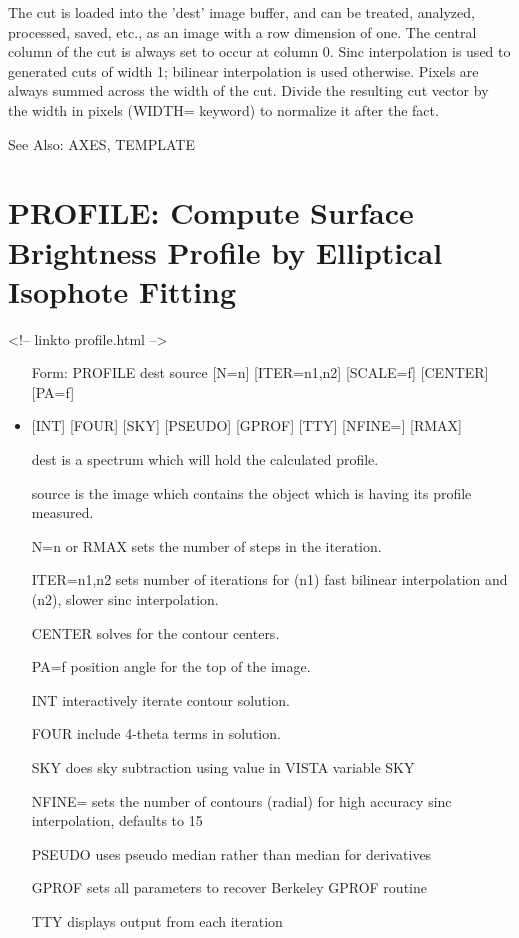 The cut is loaded into the 'dest' image buffer, and can be treated,
analyzed, processed, saved, etc., as an image with a row dimension of one.
The central column of the cut is always set to occur at column 0.  Sinc
interpolation is used to generated cuts of width 1; bilinear interpolation
is used otherwise.  Pixels are always summed across the width of the cut.
Divide the resulting cut vector by the width in pixels (WIDTH= keyword) to
normalize it after the fact.

See Also: AXES, TEMPLATE


\section{PROFILE: Compute Surface Brightness Profile by Elliptical
         Isophote Fitting}
\begin{rawhtml}
<!-- linkto profile.html -->
\end{rawhtml}
\begin{itemize}
  \item[Form: PROFILE dest source {[N=n]} {[ITER=n1,n2]} {[SCALE=f]} 
       {[CENTER]} {[PA=f]} \hfill]{}
  \item{{[INT]} {[FOUR]} {[SKY]} {[PSEUDO]} {[GPROF]} {[TTY]} {[NFINE=]} 
       {[RMAX]}}
  \item[dest]{is a spectrum which will hold the calculated profile.}
  \item[source]{is the image which contains the object which is
       having its profile measured.}
  \item[N=n or RMAX]{sets the number of steps in the iteration.}
  \item[ITER=n1,n2]{sets number of iterations for (n1) fast bilinear
       interpolation and (n2), slower sinc interpolation.}
  \item[CENTER]{solves for the contour centers.}
  \item[PA=f]{position angle for the top of the image.}
  \item[INT]{interactively iterate contour solution.}
  \item[FOUR]{include 4-theta terms in solution.}
  \item[SKY]{does sky subtraction using value in VISTA variable SKY}
  \item[NFINE=]{sets the number of contours (radial) for high accuracy 
                          sinc interpolation, defaults to 15}
  \item[PSEUDO]{uses pseudo median rather than median for derivatives}
  \item[GPROF]{sets all parameters to recover Berkeley GPROF routine}
  \item[TTY]{displays output from each iteration }
\end{itemize}

